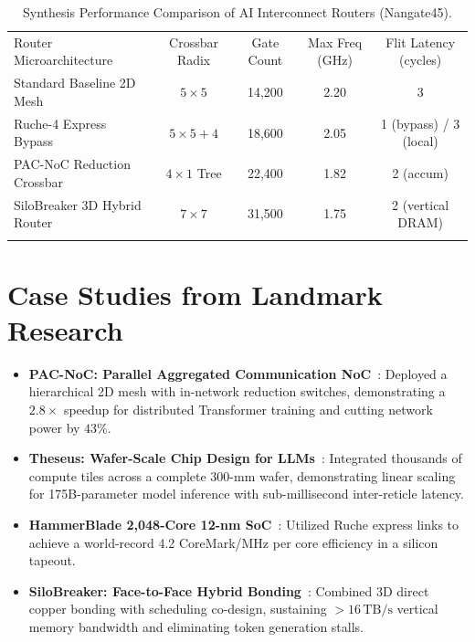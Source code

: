 \begin{table}[t]
\centering
\caption{Synthesis Performance Comparison of AI Interconnect Routers (Nangate45).}
\label{tab:ai-router-synthesis}
\begin{tabular}{lcccc}
\hline\noalign{\smallskip}
Router Microarchitecture & Crossbar Radix & Gate Count & Max Freq (GHz) & Flit Latency (cycles) \\
\noalign{\smallskip}\svhline\noalign{\smallskip}
Standard Baseline 2D Mesh & $5 \times 5$ & 14,200 & 2.20 & 3 \\
Ruche-4 Express Bypass & $5 \times 5 + 4$ & 18,600 & 2.05 & 1 (bypass) / 3 (local) \\
PAC-NoC Reduction Crossbar & $4 \times 1$ Tree & 22,400 & 1.82 & 2 (accum) \\
SiloBreaker 3D Hybrid Router & $7 \times 7$ & 31,500 & 1.75 & 2 (vertical DRAM) \\
\noalign{\smallskip}\hline
\end{tabular}
\end{table}

\section{Case Studies from Landmark Research}
\label{sec:ai-case-studies}

\begin{itemize}
    \item \textbf{PAC-NoC: Parallel Aggregated Communication NoC}~\cite{Ouyang2026PAC}: Deployed a hierarchical 2D mesh with in-network reduction switches, demonstrating a $2.8\times$ speedup for distributed Transformer training and cutting network power by $43\%$.
    \item \textbf{Theseus: Wafer-Scale Chip Design for LLMs}~\cite{Zhu2025}: Integrated thousands of compute tiles across a complete 300-mm wafer, demonstrating linear scaling for 175B-parameter model inference with sub-millisecond inter-reticle latency.
    \item \textbf{HammerBlade 2,048-Core 12-nm SoC}~\cite{Gao2026}: Utilized Ruche express links to achieve a world-record 4.2 CoreMark/MHz per core efficiency in a silicon tapeout.
    \item \textbf{SiloBreaker: Face-to-Face Hybrid Bonding}~\cite{Wu2026Silo}: Combined 3D direct copper bonding with scheduling co-design, sustaining $>16\,\mathrm{TB/s}$ vertical memory bandwidth and eliminating token generation stalls.
\end{itemize}

